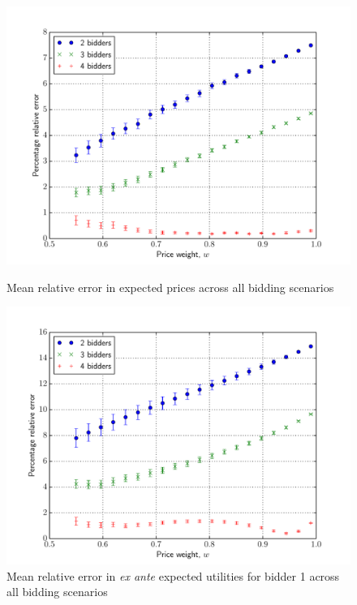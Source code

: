 \begin{figure}[p!]
  \includegraphics[width=\figsize]{Approximation/Figures/compare_price}
  \caption{Mean relative error in expected prices across all bidding scenarios}
  \label{fig:compare_price_approximation}
  \vspace{10mm}
  \includegraphics[width=\figsize]{Approximation/Figures/compare_bidder_1}
  \caption{Mean relative error in \emph{ex ante} expected utilities for bidder 1 across all bidding scenarios}
  \label{fig:compare_bidder_1_approximation}
\end{figure}
